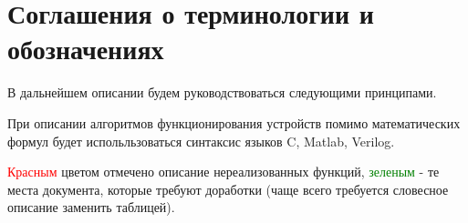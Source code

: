 
\section{Соглашения о терминологии и обозначениях}

В дальнейшем описании будем руководствоваться следующими принципами.

При описании алгоритмов функционирования устройств помимо математических формул будет испольльзоваться синтаксис языков C, Matlab, Verilog.

\textcolor{red}{Красным} цветом отмечено описание нереализованных функций, \textcolor{green}{зеленым} - те места документа, которые требуют доработки (чаще всего требуется словесное описание заменить таблицей).

